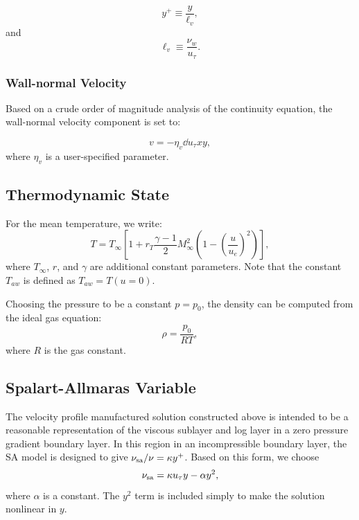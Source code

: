 %
\begin{equation}
y^+ \equiv \frac{y}{\ell_v},
\end{equation}
%
and
%
\begin{equation} \label{eqn:visc_length}
\ell_v \equiv \frac{\nu_w}{u_{\tau}}.
\end{equation}
%


\subsubsection{Wall-normal Velocity}
Based on a crude order of magnitude analysis of the continuity
equation, the wall-normal velocity component is set to:

%
\begin{equation} \label{eqn:wall_normal_vel}
v = -\eta_v \dd{u_{\tau}}{x} y ,
\end{equation}
%
where $\eta_v$ is a user-specified parameter.

\subsection{Thermodynamic State} \label{sec:thermodynamic_state}
For the mean temperature, we write:
%
\begin{equation} \label{eqn:temp_vel}
T = T_{\infty} \left[ 1 + r_T \frac{\gamma - 1}{2} M_{\infty}^2 \left( 1 - \left(\frac{u}{u_e}\right)^2 \right) \right],
\end{equation}
% 
where $T_{\infty}$, $r$, and $\gamma$ are additional constant
parameters.  Note that the constant $T_{aw}$ is defined as $T_{aw} = T(u=0)$.

Choosing the pressure to be a constant $p = p_0$, the
density can be computed from the ideal gas equation:
%
\begin{equation} \label{eqn:ideal_gas}
\rho = \frac{p_0}{R T},
\end{equation}
%
where $R$ is the gas constant.

\subsection{Spalart-Allmaras Variable} \label{sec:sa_state_field}
The velocity profile manufactured solution constructed above is
intended to be a reasonable representation of the viscous sublayer and
log layer in a zero pressure gradient boundary layer.  In this region
in an incompressible boundary layer, the SA model is designed to give
$\nu_{\mathrm{sa}}/\nu = \kappa y^+$.  Based on this form, we choose
%
\begin{equation} \label{eqn:nutil}
\nu_{\mathrm{sa}} = \kappa u_{\tau} y - \alpha y^2,
\end{equation}
%
where $\alpha$ is a constant.  The $y^2$ term is included simply to
make the solution nonlinear in $y$.

